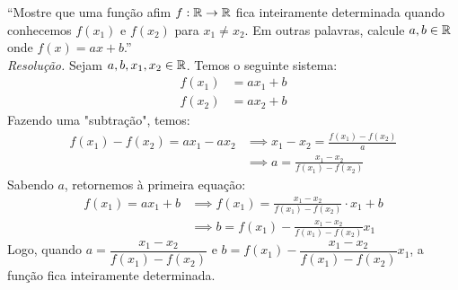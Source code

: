 \enquote{Mostre que uma função afim $f: \mathbb R \rightarrow \mathbb R$ fica inteiramente determinada quando conhecemos $f(x_1)$ e $f(x_2)$ para $x_1 \ne x_2$. Em outras palavras, calcule $a, b \in \mathbb R$ onde $f(x) = ax + b$.} \\
\emph{Resolução.} Sejam $a, b, x_1, x_2 \in \mathbb R$. Temos o seguinte sistema:
\begin{align*}
    f(x_1) &= ax_1 + b \\
    f(x_2) &= ax_2 + b 
\end{align*} 
Fazendo uma "subtração", temos:
\begin{align*}
    f(x_1) - f(x_2) = ax_1 - ax_2 & \implies
    x_1 - x_2 = \frac{f(x_1) - f(x_2)}{a} \\ & \implies
    a = \frac{x_1 - x_2}{f(x_1) - f(x_2)}
\end{align*}
Sabendo $a$, retornemos à primeira equação:
\begin{align*}
    f(x_1) = ax_1 + b & \implies f(x_1) = \frac{x_1 - x_2}{f(x_1) - f(x_2)} \cdot x_1 + b \\ & \implies 
    b = f(x_1) - \frac{x_1 - x_2}{f(x_1) - f(x_2)} x_1
\end{align*}
Logo, quando $a = \dfrac{x_1 - x_2}{f(x_1) - f(x_2)}$ e $b = f(x_1) - \dfrac{x_1 - x_2}{f(x_1) - f(x_2)} x_1$, a função fica inteiramente determinada.